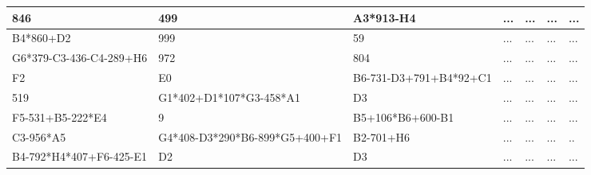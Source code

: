 \begin{center}
\begin{tabular}{ | l | l | l | l | l | l | l |}
\hline
846 & 499 & A3*913-H4 & ... & ... & ... & ... \\
\hline
B4*860+D2 & 999 & 59 & ... & ... & ... & ... \\
\hline
G6*379-C3-436-C4-289+H6 & 972 & 804 & ... & ... & ... & ... \\
\hline
F2 & E0 & B6-731-D3+791+B4*92+C1 & ... & ... & ... & ... \\
\hline
519 & G1*402+D1*107*G3-458*A1 & D3 & ... & ... & ... & ... \\
\hline
F5-531+B5-222*E4 & 9 & B5+106*B6+600-B1 & ... & ... & ... & ... \\
\hline
C3-956*A5 & G4*408-D3*290*B6-899*G5+400+F1 & B2-701+H6 & ... & ... & ... & .. \\
\hline
B4-792*H4*407+F6-425-E1 & D2 & D3 & ... & ... & ... & ... \\
\hline
\end{tabular}
\end{center}

